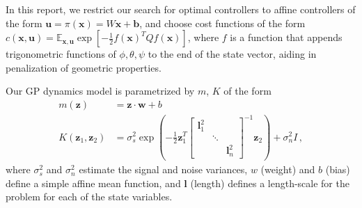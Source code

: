 \documentclass[main.tex]{subfiles}
\begin{document}
		In this report, we restrict our search for optimal controllers to affine controllers of the form
		$\bm{u} = \pi(\bm{x}) = W\bm{x} + \bm{b}$, and choose cost functions of the form
		$c(\bm{x}, \bm{u}) = \mathbb{E}_{\bm{x}, \bm{u}} \exp\left[-\frac{1}{2} f(\bm{x})^T Q f(\bm{x})\right]$, where $f$ is a function that appends trigonometric functions of $\phi, \theta, \psi$ to the end of the state vector, aiding in penalization of geometric properties.

		Our GP dynamics model is parametrized by $m$, $K$ of the form
		\begin{align}
			m(\bm{z}) &= \bm{z} \cdot \bm{w} + b \\
			K(\bm{z}_1, \bm{z}_2) &= \sigma_s^2 \exp \left(
				-\frac{1}{2}
				\bm{z}_1^T
				\begin{bmatrix}
					\bm{l}_1^2 && \\
					& \ddots & \\
					&& \bm{l}_n^2
				\end{bmatrix}^{-1}
				\bm{z}_2
			\right) + \sigma_n^2 I \,,
		\end{align}
		where $\sigma_s^2$ and $\sigma_n^2$ estimate the signal and noise variances, $w$ (weight) and $b$ (bias) define a simple affine mean function, and $\bm{l}$ (length) defines a length-scale for the problem for each of the state variables.

\bib
\end{document}
